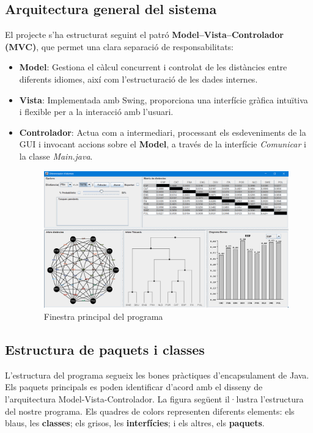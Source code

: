 \documentclass{ieeetj}
\begin{document}
\subsection{Arquitectura general del sistema}
El projecte s'ha estructurat seguint el patró \textbf{Model–Vista–Controlador (MVC)}, que permet una clara separació de responsabilitats:
\begin{itemize}
    \item \textbf{Model}: Gestiona el càlcul concurrent i controlat de les distàncies entre diferents idiomes, així com l'estructuració de les dades internes. 
    
    \item \textbf{Vista}: Implementada amb Swing, proporciona una interfície gràfica intuïtiva i flexible per a la interacció amb l'usuari. 


\item \textbf{Controlador}: Actua com a intermediari, processant els esdeveniments de la GUI i invocant accions sobre el \textbf{Model}, a través de la interfície \textit{Comunicar} i la classe \textit{Main.java}.

     \begin{figure}[H]
        \centering
        \includegraphics[width=0.8\linewidth, keepaspectratio]{png/finestraPrincipal.png}
        \caption{Finestra principal del programa}
        \label{fig:enter-label}
    \end{figure}
\end{itemize}


\subsection{Estructura de paquets i classes}
L'estructura del programa segueix les bones pràctiques d'encapsulament de Java. 
Els paquets principals es poden identificar d'acord amb el disseny de l'arquitectura Model-Vista-Controlador. 
La figura següent il·lustra l'estructura del nostre programa. \newline
Els quadres de colors representen diferents elements: \textcolor{blau}{els blaus}, les \textbf{classes}; \textcolor{gris}{els grisos}, les \textbf{interfícies};\textcolor{verd}{ i els altres}, els \textbf{paquets}.
\end{document}
